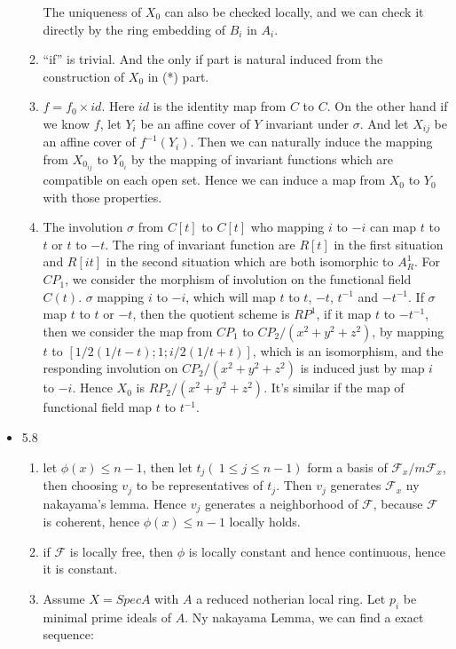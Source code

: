 \documentclass[10pt,letterpaper]{article}
\theoremstyle{plain}
\theoremstyle{definition}
\theoremstyle{remark}
\begin{document}
\begin{itemize}
\begin{enumerate}
The uniqueness of $X_{0}$ can also be checked locally, and we can check it directly by the ring embedding of $B_{i}$ in $A_{i}$.
\item ``if'' is trivial. And the only if part is natural induced from the construction of $X_{0}$ in (*) part.
\item $f=f_{0}\times id$. Here $id$ is the identity map from $C$ to $C$. On the other hand if we know $f$, let $Y_{i}$ be an affine cover of $Y$ invariant under $\sigma$. And let $X_{ij}$ be an affine cover of $f^{-1}(Y_{i})$. Then we can naturally induce the mapping from $X_{0_{ij}}$ to $Y_{0_{i}}$ by the mapping of invariant functions which are compatible on each open set. Hence we can induce a map from $X_{0}$ to $Y_{0}$ with those properties. 
\item The involution $\sigma$ from $C[t]$ to $C[t]$ who mapping $i$ to $-i$ can map $t$ to $t$ or $t$ to $-t$. The ring of invariant function are $R[t]$ in the first situation and $R[it]$ in the second situation which are both isomorphic to $A_{R}^{1}$. For $CP_{1}$, we consider the morphism of involution on the functional field $C(t)$. $\sigma$ mapping $i$ to $-i$, which will map $t$ to $t$, $-t$, $t^{-1}$ and $-t^{-1}$. If $\sigma$ map $t$ to $t$ or $-t$, then the quotient scheme is $RP^{1}$, if it map $t$ to $-t^{-1}$, then we consider the map from $CP_{1}$ to $CP_{2}/(x^{2}+y^{2}+z^{2})$, by mapping $t$ to $[1/2(1/t-t);1;i/2(1/t+t)]$, which is an isomorphism, and the responding involution on $CP_{2}/(x^{2}+y^{2}+z^{2})$ is induced just by map $i$ to $-i$. Hence $X_{0}$ is $RP_{2}/(x^{2}+y^{2}+z^{2})$. It's similar if the map of functional field map $t$ to $t^{-1}$.
\end{enumerate}
\item 5.8
\begin{enumerate}
\item let $\phi(x)\leq n-1$, then let $t_{j}(\ 1\leq j \leq n-1)$  form a basis of $\mathcal{F}_{x}/m\mathcal{F}_{x}$, then choosing $v_{j}$ to be representatives of $t_{j}$. Then $v_{j}$ generates $\mathcal{F}_{x}$ ny nakayama's lemma. Hence $v_{j}$ generates a neighborhood of $\mathcal{F}$, because $\mathcal{F}$ is coherent, hence $\phi(x)\leq n-1$ locally holds.
\item if $\mathcal{F}$ is locally free, then $\phi$ is locally constant and hence continuous, hence it is constant.
\item Assume $X=Spec A$ with $A$ a reduced notherian local ring. Let $p_{i}$ be minimal prime ideals of $A$. Ny nakayama Lemma, we can find a exact sequence:


\end{enumerate}
\end{itemize}
\end{document}
